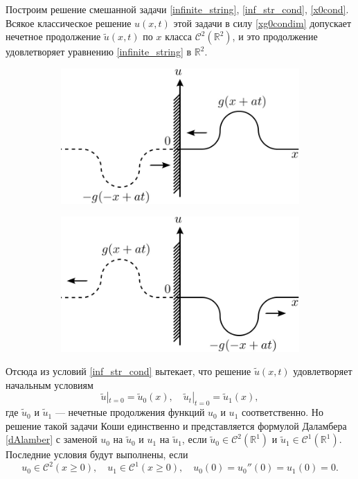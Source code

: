 Построим решение смешанной задачи \eqref{infinite_string}, \eqref{inf_str_cond}, \eqref{x0cond}. Всякое классическое решение $u(x, t)$ этой задачи в силу \eqref{xg0condim} допускает нечетное продолжение $\tilde{u}(x, t)$ по $x$ класса $\mathcal{C}^2(\mathbb{R}^2)$, и это продолжение удовлетворяет уравнению \eqref{infinite_string} в $\mathbb{R}^2$.
\begin{figure}[H]
	\centering
	\begin{subfigure}{0.4\textwidth}
		\includegraphics[width=\textwidth]{img/mirror1.png}
		\caption{}
	\end{subfigure}
	\hspace{5mm}
	\begin{subfigure}{0.4\textwidth}
		\includegraphics[width=\textwidth]{img/mirror2.png}
		\caption{}
	\end{subfigure}
	\caption{}
\end{figure}
Отсюда из условий \eqref{inf_str_cond} вытекает, что решение $\tilde{u}(x, t)$ удовлетворяет начальным условиям
\begin{equation}
	\tilde{u}|_{t = 0} = \tilde{u}_0(x), \quad \tilde{u}_t|_{t = 0} = \tilde{u}_1(x),
\end{equation}
где $\tilde{u}_0$ и $\tilde{u}_1$ --- нечетные продолжения функций $u_0$ и $u_1$ соответственно. Но решение такой задачи Коши единственно и представляется формулой Даламбера \eqref{dAlamber} с заменой $u_0$ на $\tilde{u}_0$ и $u_1$ на $\tilde{u}_1$, если $\tilde{u}_0 \in \mathcal{C}^2(\mathbb{R}^1)$ и $\tilde{u}_1 \in \mathcal{C}^1(\mathbb{R}^1)$. Последние условия будут выполнены, если
\begin{equation} \label{setcond}
	u_0 \in \mathcal{C}^2(x \geqslant 0), \quad u_1 \in \mathcal{C}^1(x \geqslant 0), \quad u_0(0) = u_0''(0) = u_1(0) = 0.
\end{equation}


